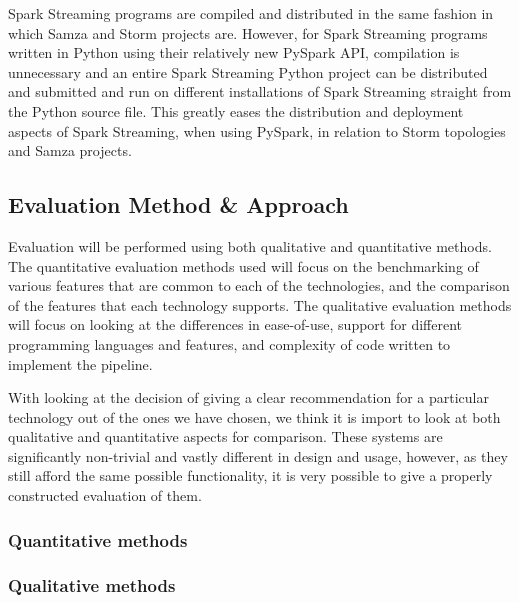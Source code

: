 Spark Streaming programs are compiled and distributed in the same fashion in which Samza and Storm projects are. However,
for Spark Streaming programs written in Python using their relatively new PySpark API, compilation is unnecessary and an entire Spark
Streaming Python project can be distributed and submitted and run on different installations of Spark Streaming straight
from the Python source file. This greatly eases the distribution and deployment aspects of Spark Streaming, when using
PySpark, in relation to Storm topologies and Samza projects.





\subsection{Evaluation Method \& Approach} %
\label{sub:evaluation_method_approach}

Evaluation will be performed using both qualitative and quantitative methods. The quantitative evaluation methods used will focus
on the benchmarking of various features that are common to each of the technologies, and the comparison of the features that
each technology supports. The qualitative evaluation methods will focus on looking at the differences in ease-of-use,
support for different programming languages and features, and complexity of code written to implement the pipeline.

With looking at the decision of giving a clear recommendation for a particular technology out of the ones we have chosen,
we think it is import to look at both qualitative and quantitative aspects for comparison. These systems are significantly
non-trivial and vastly different in design and usage, however, as they still afford the same possible functionality,
it is very possible to give a properly constructed evaluation of them.


\subsubsection{Quantitative methods} %
\label{ssub:quantitative_methods}





\subsubsection{Qualitative methods} %
\label{ssub:qualitative_methods}

